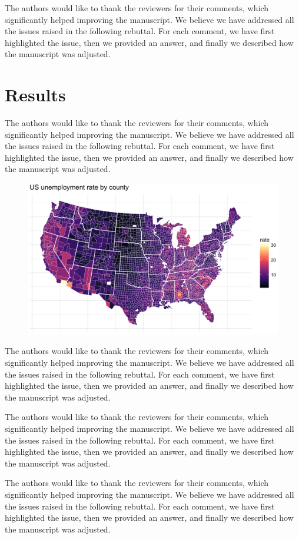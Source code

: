 \documentclass[12pt,a4paper]{article}
\begin{document}
The authors would like to thank the reviewers for their comments, which significantly helped improving the manuscript. We believe we have addressed all the issues raised in the following rebuttal. For each comment, we have first highlighted the issue, then we provided an answer, and finally we described how the manuscript was adjusted.

\section{Results}
The authors would like to thank the reviewers for their comments, which significantly helped improving the manuscript. We believe we have addressed all the issues raised in the following rebuttal. For each comment, we have first highlighted the issue, then we provided an answer, and finally we described how the manuscript was adjusted.

\begin{figure}
	\center
	\includegraphics[width=\textwidth]{figs/viridis_map.png}
\end{figure}
The authors would like to thank the reviewers for their comments, which significantly helped improving the manuscript. We believe we have addressed all the issues raised in the following rebuttal. For each comment, we have first highlighted the issue, then we provided an answer, and finally we described how the manuscript was adjusted.

The authors would like to thank the reviewers for their comments, which significantly helped improving the manuscript. We believe we have addressed all the issues raised in the following rebuttal. For each comment, we have first highlighted the issue, then we provided an answer, and finally we described how the manuscript was adjusted.

The authors would like to thank the reviewers for their comments, which significantly helped improving the manuscript. We believe we have addressed all the issues raised in the following rebuttal. For each comment, we have first highlighted the issue, then we provided an answer, and finally we described how the manuscript was adjusted.
\end{document}
